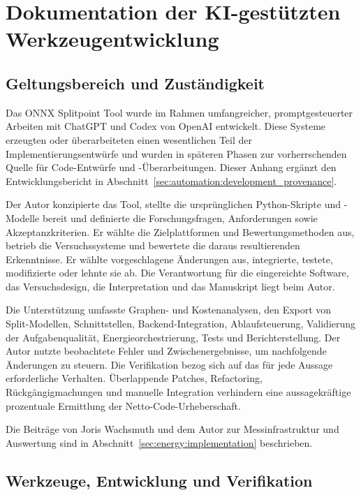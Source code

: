 \section{Dokumentation der KI-gestützten Werkzeugentwicklung}
\label{app:ai_tool_development}

\subsection{Geltungsbereich und Zuständigkeit}
\label{app:ai_tool_development:scope}

Das ONNX Splitpoint Tool wurde im Rahmen umfangreicher, promptgesteuerter Arbeiten mit ChatGPT und Codex von OpenAI \cite{openai_chatgpt,openai_codex2025} entwickelt. Diese Systeme erzeugten oder überarbeiteten einen wesentlichen Teil der Implementierungsentwürfe und wurden in späteren Phasen zur vorherrschenden Quelle für Code-Entwürfe und -Überarbeitungen. Dieser Anhang ergänzt den Entwicklungsbericht in Abschnitt~\ref{sec:automation:development_provenance}.

Der Autor konzipierte das Tool, stellte die ursprünglichen Python-Skripte und -Modelle bereit und definierte die Forschungsfragen, Anforderungen sowie Akzeptanzkriterien. Er wählte die Zielplattformen und Bewertungsmethoden aus, betrieb die Versuchssysteme und bewertete die daraus resultierenden Erkenntnisse. Er wählte vorgeschlagene Änderungen aus, integrierte, testete, modifizierte oder lehnte sie ab. Die Verantwortung für die eingereichte Software, das Versuchsdesign, die Interpretation und das Manuskript liegt beim Autor.

Die Unterstützung umfasste Graphen- und Kostenanalysen, den Export von Split-Modellen, Schnittstellen, Backend-Integration, Ablaufsteuerung, Validierung der Aufgabenqualität, Energieorchestrierung, Tests und Berichterstellung. Der Autor nutzte beobachtete Fehler und Zwischenergebnisse, um nachfolgende Änderungen zu steuern. Die Verifikation bezog sich auf das für jede Aussage erforderliche Verhalten. Überlappende Patches, Refactoring, Rückgängigmachungen und manuelle Integration verhindern eine aussagekräftige prozentuale Ermittlung der Netto-Code-Urheberschaft.

Die Beiträge von Joris Wachsmuth und dem Autor zur Messinfrastruktur und Auswertung sind in Abschnitt~\ref{sec:energy:implementation} beschrieben.

\subsection{Werkzeuge, Entwicklung und Verifikation}
\label{app:ai_tool_development:verification}


